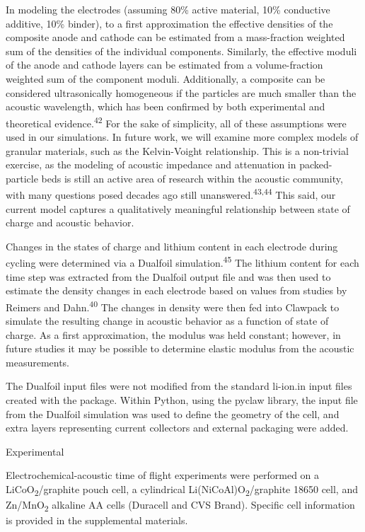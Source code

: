 \documentclass[]{article}
\begin{document}
{ }In modeling the electrodes (assuming 80\% active material, 10\%
conductive additive, 10\% binder), to a first approximation the
effective densities of the composite anode and cathode can be estimated
from a mass-fraction weighted sum of the densities of the individual
components. Similarly, the effective moduli of the anode and cathode
layers can be estimated from a volume-fraction weighted sum of the
component moduli. Additionally, a composite can be considered
ultrasonically homogeneous if the particles are much smaller than the
acoustic wavelength, which has been confirmed by both experimental and
theoretical evidence.\textsuperscript{42} For the sake of simplicity,
all of these assumptions were used in our simulations. In future work,
we will examine more complex models of granular materials, such as the
Kelvin-Voight relationship. This is a non-trivial exercise, as the
modeling of acoustic impedance and attenuation in packed-particle beds
is still an active area of research within the acoustic community, with
many questions posed decades ago still
unanswered.\textsuperscript{43,44} This said, our current model captures
a qualitatively meaningful relationship between state of charge and
acoustic behavior.

{ }Changes in the states of charge and lithium content in each electrode
during cycling were determined via a Dualfoil
simulation.\textsuperscript{45} The lithium content for each time step
was extracted from the Dualfoil output file and was then used to
estimate the density changes in each electrode based on values from
studies by Reimers and Dahn.\textsuperscript{40} The changes in density
were then fed into Clawpack to simulate the resulting change in acoustic
behavior as a function of state of charge. As a first approximation, the
modulus was held constant; however, in future studies it may be possible
to determine elastic modulus from the acoustic measurements.

{ }The Dualfoil input files were not modified from the standard
li-ion.in input files created with the package. Within Python, using the
pyclaw library, the input file from the Dualfoil simulation was used to
define the geometry of the cell, and extra layers representing current
collectors and external packaging were added.

Experimental

{ }Electrochemical-acoustic time of flight experiments were performed on
a LiCoO\textsubscript{2}/graphite pouch cell, a cylindrical
Li(NiCoAl)O\textsubscript{2}/graphite 18650 cell, and
Zn/MnO\textsubscript{2} alkaline AA cells (Duracell and CVS Brand).
Specific cell information is provided in the supplemental materials.{~}
\end{document}
